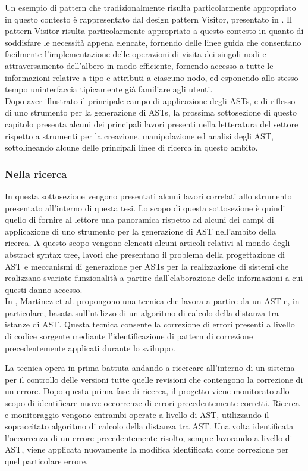 Un esempio di pattern che tradizionalmente risulta particolarmente appropriato
in questo contesto è rappresentato dal design pattern Visitor, presentato in
\cite{gamma1995design}. Il pattern Visitor risulta particolarmente appropriato a
questo contesto in quanto di soddisfare le necessità appena elencate, fornendo
delle linee guida che consentano facilmente l’implementazione delle operazioni
di visita dei singoli nodi e attraversamento dell’albero in modo efficiente,
fornendo accesso a tutte le informazioni relative a tipo e attributi a ciascuno
nodo, ed esponendo allo stesso tempo uninterfaccia tipicamente già familiare
agli utenti.\\

Dopo aver illustrato il principale campo di applicazione degli ASTs, e di
riflesso di uno strumento per la generazione di ASTs, la prossima sottosezione
di questo capitolo presenta alcuni dei principali lavori presenti nella
letteratura del settore rispetto a strumenti per la creazione, manipolazione ed
analisi degli AST, sottolineando alcune delle principali linee di ricerca in
questo ambito.

\subsubsection{Nella ricerca}
\label{ast-research}

In questa sottosezione vengono presentati alcuni lavori correlati allo strumento
presentato all’interno di questa tesi. Lo scopo di questa sottosezione è quindi
quello di fornire al lettore una panoramica rispetto ad alcuni dei campi di
applicazione di uno strumento per la generazione di AST nell'ambito della
ricerca. A questo scopo vengono elencati alcuni articoli relativi al mondo degli
abstract syntax tree, lavori che presentano il problema della progettazione di
AST e meccanismi di generazione per ASTs per la realizzazione di sistemi che
realizzano svariate funzionalità a partire dall’elaborazione delle informazioni
a cui questi danno accesso.\\

In \cite{martinez2014accurate}, Martinez et al. propongono una tecnica che
lavora a partire da un AST e, in particolare, basata sull’utilizzo di un
algoritmo di calcolo della distanza tra istanze di AST. Questa tecnica consente
la correzione di errori presenti a livello di codice sorgente mediante
l’identificazione di pattern di correzione precedentemente applicati durante lo
sviluppo.

La tecnica opera in prima battuta andando a ricercare all’interno di un sistema
per il controllo delle versioni tutte quelle revisioni che contengono la
correzione di un errore. Dopo questa prima fase di ricerca, il progetto viene
monitorato allo scopo di identificare nuove occorrenze di errori precedentemente
corretti. Ricerca e monitoraggio vengono entrambi operate a livello di AST,
utilizzando il sopraccitato algoritmo di calcolo della distanza tra AST. Una
volta identificata l’occorrenza di un errore precedentemente risolto, sempre
lavorando a livello di AST, viene applicata nuovamente la modifica identificata
come correzione per quel particolare errore.\\

